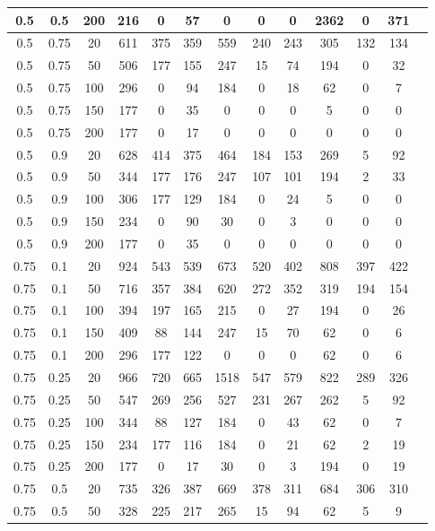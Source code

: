 \begin{table}[H]
\begin{tabular}{|c|c|c|c|c|c|c|c|c|c|c|c|c|}
0.5 & 0.5 & 200 & 216 & 0 & 57 & 0 & 0 & 0 & 2362 & 0 & 371 \\ \hline
0.5 & 0.75 & 20 & 611 & 375 & 359 & 559 & 240 & 243 & 305 & 132 & 134 \\ \hline
0.5 & 0.75 & 50 & 506 & 177 & 155 & 247 & 15 & 74 & 194 & 0 & 32 \\ \hline
0.5 & 0.75 & 100 & 296 & 0 & 94 & 184 & 0 & 18 & 62 & 0 & 7 \\ \hline
0.5 & 0.75 & 150 & 177 & 0 & 35 & 0 & 0 & 0 & 5 & 0 & 0 \\ \hline
0.5 & 0.75 & 200 & 177 & 0 & 17 & 0 & 0 & 0 & 0 & 0 & 0 \\ \hline
0.5 & 0.9 & 20 & 628 & 414 & 375 & 464 & 184 & 153 & 269 & 5 & 92 \\ \hline
0.5 & 0.9 & 50 & 344 & 177 & 176 & 247 & 107 & 101 & 194 & 2 & 33 \\ \hline
0.5 & 0.9 & 100 & 306 & 177 & 129 & 184 & 0 & 24 & 5 & 0 & 0 \\ \hline
0.5 & 0.9 & 150 & 234 & 0 & 90 & 30 & 0 & 3 & 0 & 0 & 0 \\ \hline
0.5 & 0.9 & 200 & 177 & 0 & 35 & 0 & 0 & 0 & 0 & 0 & 0 \\ \hline
0.75 & 0.1 & 20 & 924 & 543 & 539 & 673 & 520 & 402 & 808 & 397 & 422 \\ \hline
0.75 & 0.1 & 50 & 716 & 357 & 384 & 620 & 272 & 352 & 319 & 194 & 154 \\ \hline
0.75 & 0.1 & 100 & 394 & 197 & 165 & 215 & 0 & 27 & 194 & 0 & 26 \\ \hline
0.75 & 0.1 & 150 & 409 & 88 & 144 & 247 & 15 & 70 & 62 & 0 & 6 \\ \hline
0.75 & 0.1 & 200 & 296 & 177 & 122 & 0 & 0 & 0 & 62 & 0 & 6 \\ \hline
0.75 & 0.25 & 20 & 966 & 720 & 665 & 1518 & 547 & 579 & 822 & 289 & 326 \\ \hline
0.75 & 0.25 & 50 & 547 & 269 & 256 & 527 & 231 & 267 & 262 & 5 & 92 \\ \hline
0.75 & 0.25 & 100 & 344 & 88 & 127 & 184 & 0 & 43 & 62 & 0 & 7 \\ \hline
0.75 & 0.25 & 150 & 234 & 177 & 116 & 184 & 0 & 21 & 62 & 2 & 19 \\ \hline
0.75 & 0.25 & 200 & 177 & 0 & 17 & 30 & 0 & 3 & 194 & 0 & 19 \\ \hline
0.75 & 0.5 & 20 & 735 & 326 & 387 & 669 & 378 & 311 & 684 & 306 & 310 \\ \hline
0.75 & 0.5 & 50 & 328 & 225 & 217 & 265 & 15 & 94 & 62 & 5 & 9 \\ \hline

\end{tabular}
\end{table}
